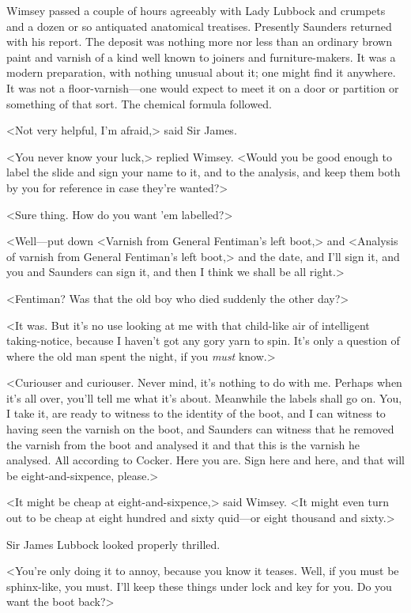 Wimsey passed a couple of hours agreeably with Lady Lubbock and crumpets and a dozen or so antiquated anatomical treatises. Presently Saunders returned with his report. The deposit was nothing more nor less than an ordinary brown paint and varnish of a kind well known to joiners and furniture-makers. It was a modern preparation, with nothing unusual about it; one might find it anywhere. It was not a floor-varnish—one would expect to meet it on a door or partition or something of that sort. The chemical formula followed.

<Not very helpful, I'm afraid,> said Sir James.

<You never know your luck,> replied Wimsey. <Would you be good enough to label the slide and sign your name to it, and to the analysis, and keep them both by you for reference in case they're wanted?>

<Sure thing. How do you want 'em labelled?>

<Well—put down <Varnish from General Fentiman's left boot,> and <Analysis of varnish from General Fentiman's left boot,> and the date, and I'll sign it, and you and Saunders can sign it, and then I think we shall be all right.>

<Fentiman? Was that the old boy who died suddenly the other day?>

<It was. But it's no use looking at me with that child-like air of intelligent taking-notice, because I haven't got any gory yarn to spin. It's only a question of where the old man spent the night, if you \emph{must} know.>

<Curiouser and curiouser. Never mind, it's nothing to do with me. Perhaps when it's all over, you'll tell me what it's about. Meanwhile the labels shall go on. You, I take it, are ready to witness to the identity of the boot, and I can witness to having seen the varnish on the boot, and Saunders can witness that he removed the varnish from the boot and analysed it and that this is the varnish he analysed. All according to Cocker. Here you are. Sign here and here, and that will be eight-and-sixpence, please.>

<It might be cheap at eight-and-sixpence,> said Wimsey. <It might even turn out to be cheap at eight hundred and sixty quid—or eight thousand and sixty.>

Sir James Lubbock looked properly thrilled.

<You're only doing it to annoy, because you know it teases. Well, if you must be sphinx-like, you must. I'll keep these things under lock and key for you. Do you want the boot back?>


